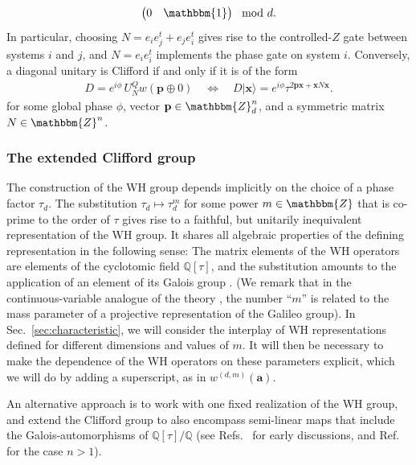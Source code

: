 \documentclass[aps,nofootinbib,floatfix,a4paper]{revtex4}
\newcommand{\1}{\mbox{$\mathbf{1}$}}
\def\ZZ{\mathbbm{Z}}
\def\Id{\mathbbm{1}}
\renewcommand{\vec}{\mathbf}
\begin{document}
\begin{itemize}
\begin{align}
\begin{pmatrix}
					0 & \Id				
				\end{pmatrix}
				\mod d.
			\end{align}
			In particular, choosing $N=e_i e_j^t + e_j e_i^t$ gives rise to the controlled-$Z$ gate between systems $i$ and $j$, and $N=e_i e_i^t$ implements the phase gate on system $i$.
			Conversely, a diagonal unitary is Clifford if and only if it is of the form
			\begin{align}\label{eqn:diagonal_clifford}
				D = e^{i\phi}\,U^Q_N w(\vec p\oplus 0)
				\quad\Leftrightarrow\quad
				D|\vec x\rangle = e^{i\phi} \tau^{2\vec p \vec x+\vec x N \vec x}.
			\end{align}
			for some global phase $\phi$, vector $\vec p \in \ZZ_d^{n}$, and a symmetric matrix $N\in\ZZ^n$.
\end{itemize}



\subsubsection{The extended Clifford group}

The construction of the WH group depends implicitly on the 
choice of a phase factor $\tau_d$. 
The substitution $\tau_d\mapsto \tau_d^m$ for some power $m\in\ZZ$ that is co-prime to the order of $\tau$ gives rise to a faithful, but unitarily inequivalent representation of the WH group.
It shares all algebraic properties of the defining representation in the following sense:
The matrix elements of the WH operators are elements of the cyclotomic field $\mathbb{Q}[\tau]$, and the substitution amounts to the application of an element of its Galois group \cite{Appleby2015GaloisUM, obst2024wigner}. 
(We remark that in the continuous-variable analogue of the theory \cite{folland_harmonic}, the number ``$m$'' is related to the mass parameter of a projective representation of the Galileo group).
In Sec.~\ref{sec:characteristic}, we will consider the interplay of WH representations defined for different dimensions and values of $m$. 
It will then be necessary to make the dependence of the WH operators on these parameters explicit,
which we will do by adding a superscript, as in $w^{(d,m)}(\vec a)$. 



An alternative approach is to work with one fixed realization of the WH group,
and extend the Clifford group to also encompass semi-linear maps that include the
Galois-automorphisms of $\mathbb{Q}[\tau]/\mathbb{Q}$ (see Refs.~\cite{Appleby2015GaloisUM,appleby2009properties} for early discussions, and Ref.~\cite{obst2024wigner} for the case $n>1$).
\end{document}
